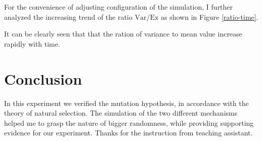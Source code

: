 \documentclass[UTF-8]{article}
\begin{document}
For the convenience of adjusting configuration of the simulation, I further analyzed the increasing trend of the ratio $\text{Var}/\text{Ex}$ as shown in Figure \ref{ratio-time}.

It can be clearly seen that that the ration of variance to mean value increase rapidly with time.

\newpage
\section{Conclusion}
In this experiment we verified the mutation hypothesis, in accordance with the theory of natural selection.
The simulation of the two different mechanisms helped me to grasp the nature of bigger randomness, while providing supporting evidence for our experiment.
Thanks for the instruction from teaching assistant.


\end{document}
